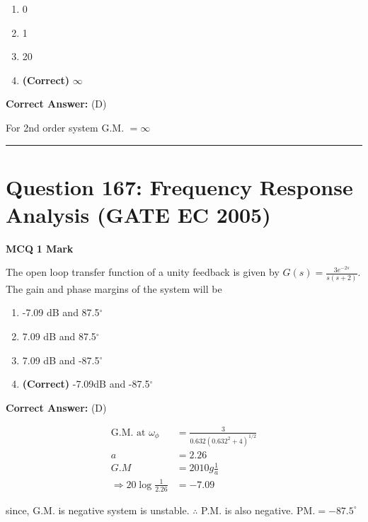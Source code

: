 \documentclass[11pt,a4paper]{article}
\begin{document}
\begin{enumerate}[label=(\Alph*)]
    \item 0
    \item 1
    \item 20
    \item \textbf{(Correct)} $\infty$
\end{enumerate}

\noindent \textbf{Correct Answer:} (D)

\begin{tcolorbox}[solbox, title=Detailed Solution -- Question 166]
For 2nd order system G.M. $=\infty$
\end{tcolorbox}

\vspace{1.5em}
\hrule
\vspace{1.5em}

\section*{Question 167: Frequency Response Analysis (GATE EC 2005)}
\noindent \textbf{\color{primary}MCQ} \hfill \textbf{\color{secondary}1 Mark}


\noindent The open loop transfer function of a unity feedback is given by $G(s)=\frac{3e^{-2s}}{s(s+2)}$. 
  The gain and phase margins of the system will be


\begin{enumerate}[label=(\Alph*)]
    \item -7.09 dB  and  87.5$^{\circ}$
    \item 7.09 dB and 87.5$^{\circ}$
    \item 7.09 dB and -87.5$^{\circ}$
    \item \textbf{(Correct)} -7.09dB and  -87.5$^{\circ}$
\end{enumerate}

\noindent \textbf{Correct Answer:} (D)

\begin{tcolorbox}[solbox, title=Detailed Solution -- Question 167]
\[
\begin{aligned} \text{G.M. at }\omega_{\phi}&=\frac{3}{0.632\left(0.632^{2}+4\right)^{1 / 2}} \\ a &=2.26 \\ G . M &=2010 g \frac{1}{a} \\ \Rightarrow 20 \log \frac{1}{2.26} &=-7.09 \end{aligned}
\]

 since, G.M. is negative system is unstable. 
$\therefore$ P.M. is also negative. 
$\mathrm{P} \mathrm{M} .=-87.5^{\circ}$
\end{tcolorbox}
\end{document}
